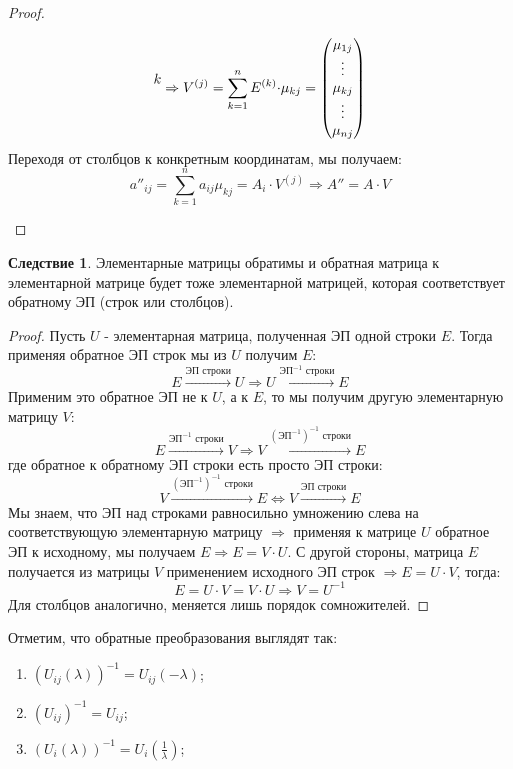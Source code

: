 \documentclass[12pt]{article}
\theoremstyle{definition}
\newtheorem{corollary}{Следствие}
\newcommand{\ddsum}[2]{\displaystyle\sum\limits_{#1}^{#2}}
\begin{document}
\begin{proof}
\begin{enumerate}[label = \arabic*)]
$$\begin{matrix}
\begin{matrix}
					\\
					k\\
					\\
					\vphantom{0}
				\end{matrix}
			\end{matrix}
			\Rightarrow V^{(j)} = \ddsum{k = 1}{n}E^{(k)}{\cdot}\mu_{kj}=
			\begin{pmatrix}
				\mu_{1j}\\
				\vdots\\
				\mu_{kj}\\
				\vdots\\
				\mu_{nj}
			\end{pmatrix}
		$$
		Переходя от столбцов к конкретным координатам, мы получаем:
		$$
			a''_{ij} = \ddsum{k = 1}{n}a_{ij}\mu_{kj} = A_i{\cdot}V^{(j)} \Rightarrow A'' = A{\cdot}V
		$$
	\end{enumerate}
\end{proof}
\begin{corollary}
	Элементарные матрицы обратимы и обратная матрица к элементарной матрице будет тоже элементарной матрицей, которая соответствует обратному ЭП (строк или столбцов).
\end{corollary}
\begin{proof}
	Пусть $U$ - элементарная матрица, полученная ЭП одной строки $E$. Тогда применяя обратное ЭП строк мы из $U$ получим $E$: 
	$$
		E \xrightarrow{\text{ЭП строки}} U \Rightarrow U \xrightarrow{\text{ЭП}^{-1} \text{ строки}} E
	$$
	Применим это обратное ЭП не к $U$, а к $E$, то мы получим другую элементарную матрицу $V$:
	$$
		E \xrightarrow{\text{ЭП}^{-1} \text{ строки}} V \Rightarrow V \xrightarrow{(\text{ЭП}^{-1})^{-1} \text{ строки}} E
	$$
	где обратное к обратному ЭП строки есть просто ЭП строки:
	$$
		V \xrightarrow{(\text{ЭП}^{-1})^{-1} \text{ строки}} E \Leftrightarrow V \xrightarrow{\text{ЭП строки}} E
	$$
	Мы знаем, что ЭП над строками равносильно умножению слева на соответствующую элементарную матрицу $\Rightarrow$ применяя к матрице $U$ обратное ЭП к исходному, мы получаем $E \Rightarrow E = V{\cdot}U$. С другой стороны, матрица $E$ получается из матрицы $V$ применением исходного ЭП строк $\Rightarrow E = U{\cdot}V$, тогда:
	$$
		E = U{\cdot}V = V{\cdot}U \Rightarrow V = U^{-1}
	$$
	Для столбцов аналогично, меняется лишь порядок сомножителей.
\end{proof}
Отметим, что обратные преобразования выглядят так:
\begin{enumerate}[label = \arabic*)]
	\item $\left(U_{ij}(\lambda)\right)^{-1} = U_{ij}(-\lambda)$;
	\item $\left(U_{ij}\right)^{-1} = U_{ij}$;
	\item $\left(U_i(\lambda)\right)^{-1} = U_i\left(\frac{1}{\lambda}\right)$;
\end{enumerate}
\end{document}
